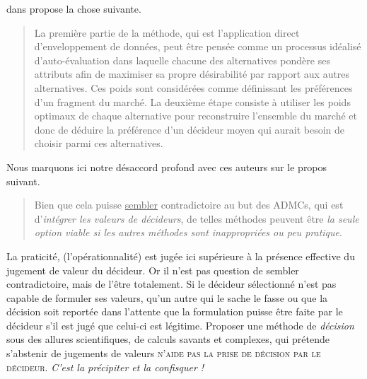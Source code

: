 \citeauthor*{doyle_multiattribute_1995} dans  propose la chose suivante.
\blockcquote[traduction]{doyle_multiattribute_1995}{
La première partie de la méthode, qui est l'application direct d'enveloppement de données, peut être pensée comme un processus idéalisé d'auto-évaluation dans laquelle chacune des alternatives pondère ses attributs afin de maximiser sa propre désirabilité par rapport aux autres alternatives.
Ces poids sont considérées comme définissant les préférences d'un fragment du marché.
La deuxième étape consiste à utiliser les poids optimaux de chaque alternative pour reconstruire l'ensemble du marché et donc de déduire la préférence d'un décideur moyen qui aurait besoin de choisir parmi ces alternatives.
}
%



Nous marquons ici notre désaccord profond avec ces auteurs sur le propos suivant.
\blockcquote[traduction]{rowley_aggregating_2012}{
Bien que cela puisse \underline{sembler} contradictoire au but des \glspl{ADMC}, qui est d'\emph{intégrer les valeurs de décideurs}, de telles méthodes peuvent être \emph{la seule option viable si les autres méthodes sont inappropriées ou peu pratique}.
}
La praticité, (l’opérationnalité) est jugée ici supérieure à la présence effective du jugement de valeur du décideur.
Or il n'est pas question de sembler contradictoire, mais de l'être totalement.
Si le décideur sélectionné n'est pas capable de formuler ses valeurs, qu'un autre qui le sache le fasse ou que la décision soit reportée dans l'attente que la formulation puisse être faite par le décideur s'il est jugé que celui-ci est légitime.
Proposer une méthode de \emph{décision} sous des allures scientifiques, de calculs savants et complexes, qui prétende s'abstenir de jugements de valeurs \textsc{n'aide pas la prise de décision par le décideur}.
\emph{C'est la précipiter et la confisquer !}
